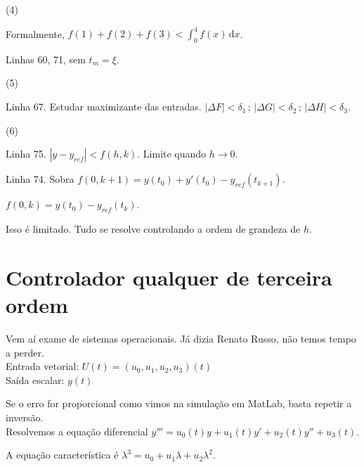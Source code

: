 \documentclass[12pt]{article}
\begin{document}
(4)

Formalmente, $f(1) + f(2) + f(3) < \int_0^4 f(x) \,\mathrm{d}x$.

Linhas 60, 71, sem $t_m = \xi$.

\vspace{3mm}

(5)

Linha 67. Estudar maximizante das entradas. $|\Delta F| < \delta_1\,;\,|\Delta G| < \delta_2\,;\,|\Delta H| < \delta_3$.

\vspace{3mm}

(6)

Linha 75. $| y - y_{ref} | < f(h,k)$. Limite quando $h \to 0$.

Linha 74. Sobra $f(0, k + 1) = y(t_0) + y'(t_0) - y_{ref}(t_{k + 1})$.

$f(0, k) = y(t_0) - y_{ref}(t_{k})$.

Isso \'e limitado. Tudo se resolve controlando a ordem de grandeza de $h$.

\section{Controlador qualquer de terceira ordem}

\begin{flushleft}
Vem a\'i exame de sistemas operacionais. J\'a dizia Renato Russo, n\~ao temos tempo a perder. \\
Entrada vetorial: $U(t) = (u_0,u_1,u_2,u_3)(t)$ \\
Sa\'ida escalar: $y(t)$
\end{flushleft}

Se o erro for proporcional como vimos na simula\c{c}\~ao em MatLab, basta repetir a invers\~ao. \\

Resolvemos a equa\c{c}\~ao diferencial $y''' = u_0(t) y + u_1(t) y' + u_2(t) y'' + u_3(t)$.

A equa\c{c}\~ao caracter\'istica \'e $\lambda^3 = u_0 + u_1\lambda + u_2 \lambda^2$.
\end{document}
